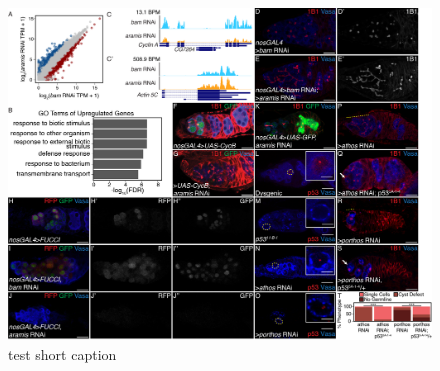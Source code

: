 \documentclass[12pt,oneside]{reedthesis}
\begin{document}
\begin{figure}

{\centering \includegraphics[width=7 in,height=5.409091 in]{./figure/Ribosome Biogenesis/Ribosome Biogenesis 3S} 

}

\caption[test short caption]{test short caption}\label{fig:unnamed-chunk-11}
\end{figure}
\end{document}
